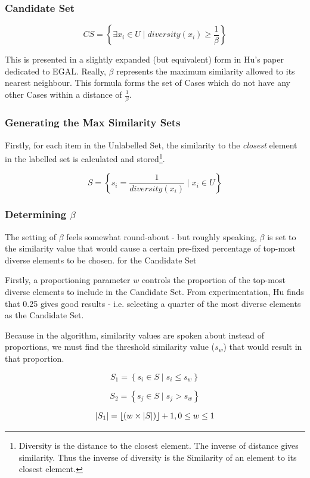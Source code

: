 \documentclass[a4paper,11pt]{report}
\begin{document}
\subsubsection{Candidate Set}
\[
CS=\left\{ \exists x_{i}\in U\mid diversity(x_{i})\geq\frac{1}{\beta}\right\} 
\]

This is presented in a slightly expanded (but equivalent) form in Hu's paper dedicated to EGAL\cite{Hu2010}. Really, $\beta$ represents the maximum similarity allowed to its nearest neighbour. This formula forms the set of Cases which do not have any other Cases within a distance of $\frac{1}{\beta}$.

\subsubsection{Generating the Max Similarity Sets}

Firstly, for each item in the Unlabelled Set, the similarity to the \emph{closest} element in the labelled set is calculated and stored\footnote{Diversity is the distance to the closest element. The inverse of distance gives similarity. Thus the inverse of diversity is the Similarity of an element to its closest element.}.

\[
S=\left\{ s_{i}=\frac{1}{diversity(x_{i})}\mid x_{i}\in U\right\} 
\]

\subsubsection{Determining $\beta$}
The setting of $\beta$ feels somewhat round-about - but roughly speaking, $\beta$ is set to the similarity value that would cause a certain pre-fixed percentage of top-most diverse elements to be chosen. for the Candidate Set

Firstly, a proportioning parameter $w$ controls the proportion of the top-most diverse elements to include in the Candidate Set. From experimentation, Hu finds that 0.25 gives good results - i.e. selecting a quarter of the most diverse elements as the Candidate Set.

Because in the algorithm, similarity values are spoken about instead of proportions, we must find the threshold similarity value ($s_{w}$) that would result in that proportion.

\[
S_{1}=\left\{ s_{i}\in S\mid s_{i}\leq s_{w}\right\} 
\]

\[
S_{2}=\left\{ s_{j}\in S\mid s_{j}>s_{w}\right\} 
\]

\[
\left|S_{1}\right|=\left\lfloor \left(w\times\left|S\right|\right)\right\rfloor +1,\hphantom{}0\leq w\leq 1
\]
\end{document}

